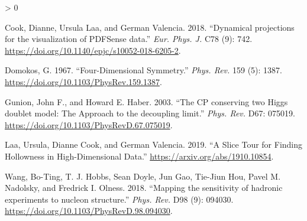 \documentclass[
]{article}
\newlength{\cslhangindent}
\newenvironment{CSLReferences}[2] %
 {%
  \setlength{\parindent}{0pt}
  \ifodd #1 \everypar{\setlength{\hangindent}{\cslhangindent}}\ignorespaces\fi
  \ifnum #2 > 0
  \setlength{\parskip}{#2\baselineskip}
  \fi
 }%
 {}
\begin{document}
\hypertarget{refs}{}
\begin{CSLReferences}{1}{0}
\leavevmode\hypertarget{ref-Cook:2018mvr}{}%
Cook, Dianne, Ursula Laa, and German Valencia. 2018. {``{Dynamical
projections for the visualization of PDFSense data}.''} \emph{Eur. Phys.
J.} C78 (9): 742. \url{https://doi.org/10.1140/epjc/s10052-018-6205-2}.

\leavevmode\hypertarget{ref-Domokos:1967fgx}{}%
Domokos, G. 1967. {``{Four-Dimensional Symmetry}.''} \emph{Phys. Rev.}
159 (5): 1387. \url{https://doi.org/10.1103/PhysRev.159.1387}.

\leavevmode\hypertarget{ref-Gunion:2002zf}{}%
Gunion, John F., and Howard E. Haber. 2003. {``{The CP conserving two
Higgs doublet model: The Approach to the decoupling limit}.''}
\emph{Phys. Rev.} D67: 075019.
\url{https://doi.org/10.1103/PhysRevD.67.075019}.

\leavevmode\hypertarget{ref-laa2019slice}{}%
Laa, Ursula, Dianne Cook, and German Valencia. 2019. {``A Slice Tour for
Finding Hollowness in High-Dimensional Data.''}
\url{https://arxiv.org/abs/1910.10854}.

\leavevmode\hypertarget{ref-Wang:2018heo}{}%
Wang, Bo-Ting, T. J. Hobbs, Sean Doyle, Jun Gao, Tie-Jiun Hou, Pavel M.
Nadolsky, and Fredrick I. Olness. 2018. {``{Mapping the sensitivity of
hadronic experiments to nucleon structure}.''} \emph{Phys. Rev.} D98
(9): 094030. \url{https://doi.org/10.1103/PhysRevD.98.094030}.

\end{CSLReferences}
\end{document}
